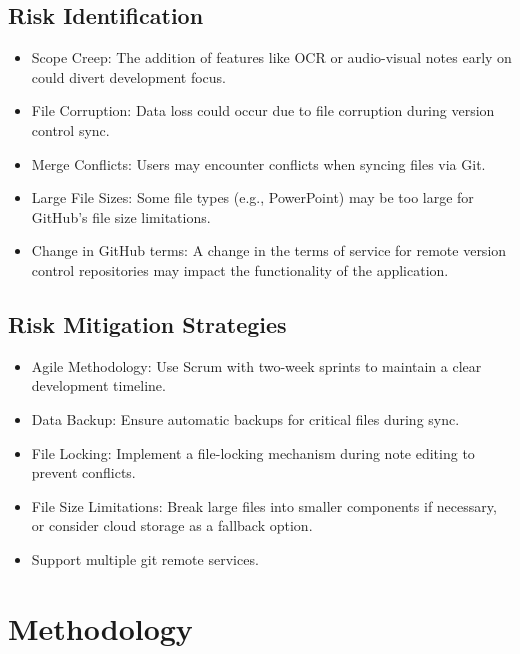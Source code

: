 \subsection{Risk Identification}
\begin{itemize}
    \item Scope Creep: The addition of features like OCR or audio-visual notes early on could divert development focus.
    \item File Corruption: Data loss could occur due to file corruption during version control sync.
    \item Merge Conflicts: Users may encounter conflicts when syncing files via Git.
    \item Large File Sizes: Some file types (e.g., PowerPoint) may be too large for GitHub’s file size limitations.
    \item Change in GitHub terms: A change in the terms of service for remote version control repositories may impact the functionality of the application. 
\end{itemize}

\subsection{Risk Mitigation Strategies}
\begin{itemize}
    \item Agile Methodology: Use Scrum with two-week sprints to maintain a clear development timeline.
    \item Data Backup: Ensure automatic backups for critical files during sync.
    \item File Locking: Implement a file-locking mechanism during note editing to prevent conflicts.
    \item File Size Limitations: Break large files into smaller components if necessary, or consider cloud storage as a fallback option.
    \item Support multiple git remote services. 
\end{itemize}


\section{Methodology}



